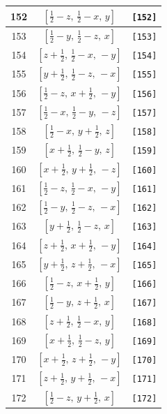 \documentclass[fleqn,8pt]{jsarticle}
\begin{document}
\begin{longtable}{ccc}
152 & $\left[ \frac{1}{2} - z,\, \frac{1}{2} - x,\, y \right]$ & {\tt [152]} \\ \hline
153 & $\left[ \frac{1}{2} - y,\, \frac{1}{2} - z,\, x \right]$ & {\tt [153]} \\ \hline
154 & $\left[ z + \frac{1}{2},\, \frac{1}{2} - x,\, - y \right]$ & {\tt [154]} \\ \hline
155 & $\left[ y + \frac{1}{2},\, \frac{1}{2} - z,\, - x \right]$ & {\tt [155]} \\ \hline
156 & $\left[ \frac{1}{2} - z,\, x + \frac{1}{2},\, - y \right]$ & {\tt [156]} \\ \hline
157 & $\left[ \frac{1}{2} - x,\, \frac{1}{2} - y,\, - z \right]$ & {\tt [157]} \\ \hline
158 & $\left[ \frac{1}{2} - x,\, y + \frac{1}{2},\, z \right]$ & {\tt [158]} \\ \hline
159 & $\left[ x + \frac{1}{2},\, \frac{1}{2} - y,\, z \right]$ & {\tt [159]} \\ \hline
160 & $\left[ x + \frac{1}{2},\, y + \frac{1}{2},\, - z \right]$ & {\tt [160]} \\ \hline
161 & $\left[ \frac{1}{2} - z,\, \frac{1}{2} - x,\, - y \right]$ & {\tt [161]} \\ \hline
162 & $\left[ \frac{1}{2} - y,\, \frac{1}{2} - z,\, - x \right]$ & {\tt [162]} \\ \hline
163 & $\left[ y + \frac{1}{2},\, \frac{1}{2} - z,\, x \right]$ & {\tt [163]} \\ \hline
164 & $\left[ z + \frac{1}{2},\, x + \frac{1}{2},\, - y \right]$ & {\tt [164]} \\ \hline
165 & $\left[ y + \frac{1}{2},\, z + \frac{1}{2},\, - x \right]$ & {\tt [165]} \\ \hline
166 & $\left[ \frac{1}{2} - z,\, x + \frac{1}{2},\, y \right]$ & {\tt [166]} \\ \hline
167 & $\left[ \frac{1}{2} - y,\, z + \frac{1}{2},\, x \right]$ & {\tt [167]} \\ \hline
168 & $\left[ z + \frac{1}{2},\, \frac{1}{2} - x,\, y \right]$ & {\tt [168]} \\ \hline
169 & $\left[ x + \frac{1}{2},\, \frac{1}{2} - z,\, y \right]$ & {\tt [169]} \\ \hline
170 & $\left[ x + \frac{1}{2},\, z + \frac{1}{2},\, - y \right]$ & {\tt [170]} \\ \hline
171 & $\left[ z + \frac{1}{2},\, y + \frac{1}{2},\, - x \right]$ & {\tt [171]} \\ \hline
172 & $\left[ \frac{1}{2} - z,\, y + \frac{1}{2},\, x \right]$ & {\tt [172]} \\ \hline

\end{longtable}
\end{document}
